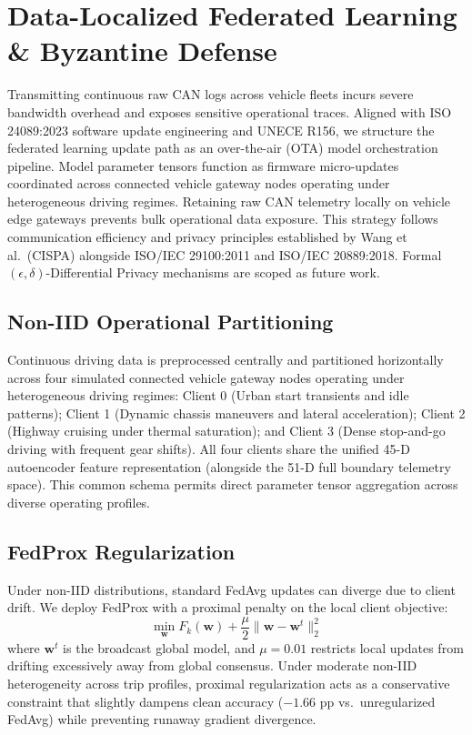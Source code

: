 \documentclass[conference]{IEEEtran}
\begin{document}
\section{Data-Localized Federated Learning \& Byzantine Defense}

Transmitting continuous raw CAN logs across vehicle fleets incurs severe bandwidth overhead and exposes sensitive operational traces. Aligned with ISO 24089:2023 software update engineering and UNECE R156, we structure the federated learning update path as an over-the-air (OTA) model orchestration pipeline. Model parameter tensors function as firmware micro-updates coordinated across connected vehicle gateway nodes operating under heterogeneous driving regimes. Retaining raw CAN telemetry locally on vehicle edge gateways prevents bulk operational data exposure. This strategy follows communication efficiency and privacy principles established by Wang et al.\ (CISPA) \cite{fritz2022fl} alongside ISO/IEC 29100:2011 and ISO/IEC 20889:2018. Formal $(\epsilon, \delta)$-Differential Privacy mechanisms are scoped as future work.

\subsection{Non-IID Operational Partitioning}
Continuous driving data is preprocessed centrally and partitioned horizontally across four simulated connected vehicle gateway nodes operating under heterogeneous driving regimes: Client 0 (Urban start transients and idle patterns); Client 1 (Dynamic chassis maneuvers and lateral acceleration); Client 2 (Highway cruising under thermal saturation); and Client 3 (Dense stop-and-go driving with frequent gear shifts). All four clients share the unified 45-D autoencoder feature representation (alongside the 51-D full boundary telemetry space). This common schema permits direct parameter tensor aggregation across diverse operating profiles.

\subsection{FedProx Regularization}
Under non-IID distributions, standard FedAvg updates can diverge due to client drift. We deploy FedProx \cite{li2020fedprox} with a proximal penalty on the local client objective:
\begin{equation}
    \min_{\mathbf{w}} F_k(\mathbf{w}) + \frac{\mu}{2} \|\mathbf{w} - \mathbf{w}^t\|_2^2
\end{equation}
where $\mathbf{w}^t$ is the broadcast global model, and $\mu = 0.01$ restricts local updates from drifting excessively away from global consensus. Under moderate non-IID heterogeneity across trip profiles, proximal regularization acts as a conservative constraint that slightly dampens clean accuracy ($-1.66$ pp vs.\ unregularized FedAvg) while preventing runaway gradient divergence.
\end{document}
